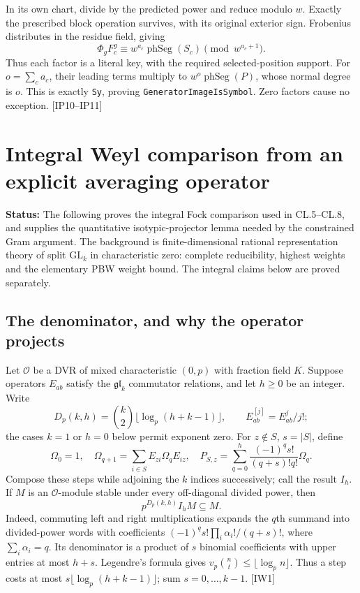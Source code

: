 \documentclass[11pt,a4paper]{article}
\numberwithin{equation}{section}
\theoremstyle{remark}\newtheorem{remark}[theorem]{Remark}
\newcommand{\status}[1]{\textbf{Status:} #1}
\begin{document}
In its own chart, divide by the predicted power and reduce modulo $w$. Exactly the prescribed block operation survives, with its original exterior sign. Frobenius distributes in the residue field, giving
\[
 \Phi_gF_c^g\equiv w^{a_c}\operatorname{phSeg}(S_c)
                 \pmod{w^{a_c+1}}.
 \tag{IP.6}
\]
Thus each factor is a literal key, with the required selected-position support. For $o=\sum_ca_c$, their leading terms multiply to $w^o\operatorname{phSeg}(P)$, whose normal degree is $o$. This is exactly \texttt{Sy}, proving \texttt{GeneratorImageIsSymbol}. Zero factors cause no exception. \textsf{[IP10--IP11]}

\section{Integral Weyl comparison from an explicit averaging operator}
\label{sec:integral-weyl}

\status{The following proves the integral Fock comparison used in CL.5--CL.8, and supplies the quantitative isotypic-projector lemma needed by the constrained Gram argument. The background is finite-dimensional rational representation theory of split $\mathrm{GL}_k$ in characteristic zero: complete reducibility, highest weights and the elementary PBW weight bound. The integral claims below are proved separately.}

\subsection{The denominator, and why the operator projects}

Let $\mathcal O$ be a DVR of mixed characteristic $(0,p)$ with fraction field $K$.
Suppose operators $E_{ab}$ satisfy the $\mathfrak{gl}_k$ commutator relations, and let $h\ge0$ be an integer. Write
\[
 D_p(k,h)=\binom{k}{2}\lfloor\log_p(h+k-1)\rfloor,
 \qquad E_{ab}^{[j]}=E_{ab}^j/j!;
 \tag{IW.1}
\]
the cases $k=1$ or $h=0$ below permit exponent zero.
For $z\notin S$, $s=|S|$, define
\[
 \Omega_0=1,\quad \Omega_{q+1}=\sum_{i\in S}E_{zi}\Omega_qE_{iz},\quad
 P_{S,z}=\sum_{q=0}^{h}\frac{(-1)^qs!}{(q+s)!q!}\Omega_q.
\]
Compose these steps while adjoining the $k$ indices successively; call the result $I_h$.
If $M$ is an $\mathcal O$-module stable under every off-diagonal divided power, then
\[
 p^{D_p(k,h)}I_hM\subseteq M. \tag{IW.2}
\]
Indeed, commuting left and right multiplications expands the $q$th summand into divided-power words with coefficients
$(-1)^qs!\prod_i\alpha_i!/(q+s)!$, where $\sum_i\alpha_i=q$.
Its denominator is a product of $s$ binomial coefficients with upper entries at most $h+s$.
Legendre's formula gives $v_p\binom nt\le\lfloor\log_p n\rfloor$.
Thus a step costs at most $s\lfloor\log_p(h+k-1)\rfloor$; sum $s=0,\ldots,k-1$. \textsf{[IW1]}\cite{weyl-integral,weyl-form}
\end{document}
